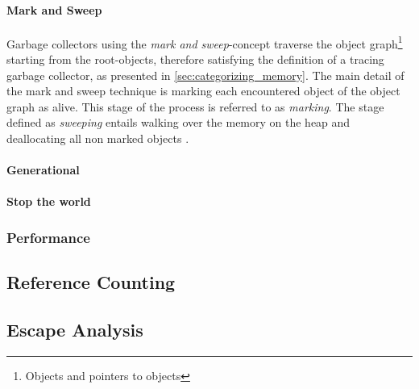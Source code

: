 \paragraph{Mark and Sweep}

Garbage collectors using the \textit{mark and sweep}-concept traverse the
object graph\footnote{Objects and pointers to objects} starting from the
root-objects, therefore satisfying the definition of a tracing garbage
collector, as presented in \autoref{sec:categorizing_memory}. The main detail
of the mark and sweep technique is marking each encountered object of the
object graph as alive. This stage of the process is referred to as
\textit{marking}. The stage defined as \textit{sweeping} entails walking over
the memory on the heap and deallocating all non marked objects \cite[Tracing
Garbage Collection]{go_gcguide_2022}.

\paragraph{Generational}
\paragraph{Stop the world}
\subsubsection{Performance}

\subsection{Reference Counting}
\subsection{Escape Analysis}
